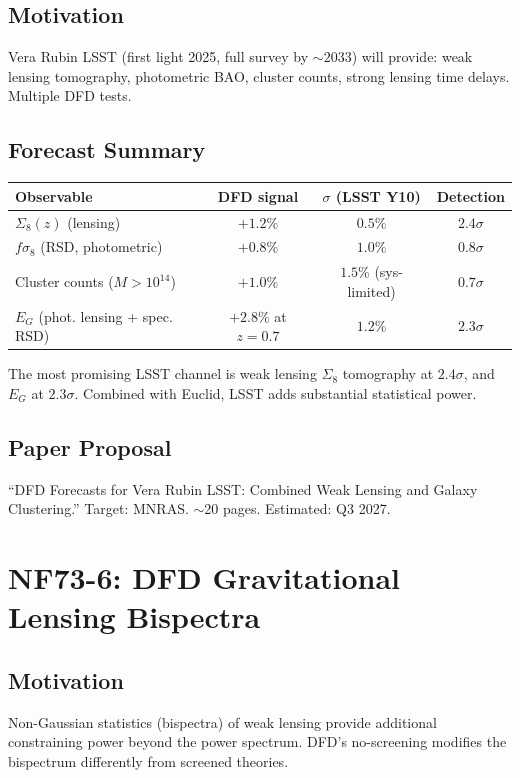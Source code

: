 \documentclass[11pt,a4paper]{article}
\begin{document}
\subsection{Motivation}
Vera Rubin LSST (first light 2025, full survey by $\sim 2033$) will provide: weak lensing tomography, photometric BAO, cluster counts, strong lensing time delays. Multiple DFD tests.

\subsection{Forecast Summary}
\begin{center}
\begin{tabular}{lccc}
\toprule
\textbf{Observable} & \textbf{DFD signal} & $\sigma$ \textbf{(LSST Y10)} & \textbf{Detection} \\
\midrule
$\Sigma_8(z)$ (lensing) & $+1.2\%$ & $0.5\%$ & $2.4\sigma$ \\
$f\sigma_8$ (RSD, photometric) & $+0.8\%$ & $1.0\%$ & $0.8\sigma$ \\
Cluster counts ($M > 10^{14}$) & $+1.0\%$ & $1.5\%$ (sys-limited) & $0.7\sigma$ \\
$E_G$ (phot. lensing + spec. RSD) & $+2.8\%$ at $z = 0.7$ & $1.2\%$ & $2.3\sigma$ \\
\bottomrule
\end{tabular}
\end{center}

The most promising LSST channel is weak lensing $\Sigma_8$ tomography at $2.4\sigma$, and $E_G$ at $2.3\sigma$. Combined with Euclid, LSST adds substantial statistical power.

\subsection{Paper Proposal}
``DFD Forecasts for Vera Rubin LSST: Combined Weak Lensing and Galaxy Clustering.'' Target: MNRAS. $\sim$20 pages. Estimated: Q3 2027.

\section{NF73-6: DFD Gravitational Lensing Bispectra}

\subsection{Motivation}
Non-Gaussian statistics (bispectra) of weak lensing provide additional constraining power beyond the power spectrum. DFD's no-screening modifies the bispectrum differently from screened theories.
\end{document}
